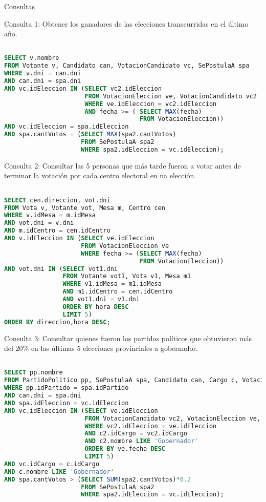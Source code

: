 \begin{section}{Consultas}


Consulta 1: Obtener los ganadores de las elecciones transcurridas en el \'ultimo año.

\begin{lstlisting}[language=SQL]

SELECT v.nombre
FROM Votante v, Candidato can, VotacionCandidato vc, SePostulaA spa
WHERE v.dni = can.dni
AND can.dni = spa.dni
AND vc.idEleccion IN (SELECT vc2.idEleccion
                      FROM VotacionEleccion ve, VotacionCandidato vc2
                      WHERE ve.idEleccion = vc2.idEleccion
                      AND fecha >= ( SELECT MAX(fecha)
                                     FROM VotacionEleccion))
AND vc.idEleccion = spa.idEleccion
AND spa.cantVotos = (SELECT MAX(spa2.cantVotos)
                     FROM SePostulaA spa2
                     WHERE spa2.idEleccion = vc.idEleccion);

\end{lstlisting} 

Consulta 2: Consultar las 5 personas que m\'as tarde fueron a votar antes de terminar la votaci\'on por cada centro electoral en na elecci\'on.

\begin{lstlisting}[language=SQL]

SELECT cen.direccion, vot.dni
FROM Vota v, Votante vot, Mesa m, Centro cen
WHERE v.idMesa = m.idMesa
AND vot.dni = v.dni
AND m.idCentro = cen.idCentro
AND v.idEleccion IN (SELECT ve.idEleccion
                     FROM VotacionEleccion ve
                     WHERE fecha >= (SELECT MAX(fecha)
                                     FROM VotacionEleccion))
AND vot.dni IN (SELECT vot1.dni
                FROM Votante vot1, Vota v1, Mesa m1
                WHERE v1.idMesa = m1.idMesa
                AND m1.idCentro = cen.idCentro
                AND vot1.dni = v1.dni
                ORDER BY hora DESC
                LIMIT 5)
ORDER BY direccion,hora DESC;


\end{lstlisting} 

Consulta 3: Consultar quienes fueron los partidos pol\'iticos que obtuvieron m\'as del 20$\%$ en las \'ultimas 5 elecciones provinciales a gobernador.

\begin{lstlisting}[language=SQL]

SELECT pp.nombre
FROM PartidoPolitico pp, SePostulaA spa, Candidato can, Cargo c, VotacionCandidato vc
WHERE pp.idPartido = spa.idPartido
AND can.dni = spa.dni
AND spa.idEleccion = vc.idEleccion
AND vc.idEleccion IN (SELECT ve.idEleccion
                      FROM VotacionCandidato vc2, VotacionEleccion ve, Cargo c2
                      WHERE vc2.idEleccion = ve.idEleccion
                      AND c2.idCargo = vc2.idCargo
                      AND c2.nombre LIKE 'Gobernador'
                      ORDER BY ve.fecha DESC
                      LIMIT 5)
AND vc.idCargo = c.idCargo
AND c.nombre LIKE 'Gobernador'
AND spa.cantVotos > (SELECT SUM(spa2.cantVotos)*0.2
                     FROM SePostulaA spa2
                     WHERE spa2.idEleccion = vc.idEleccion);


\end{lstlisting}
\end{section}
